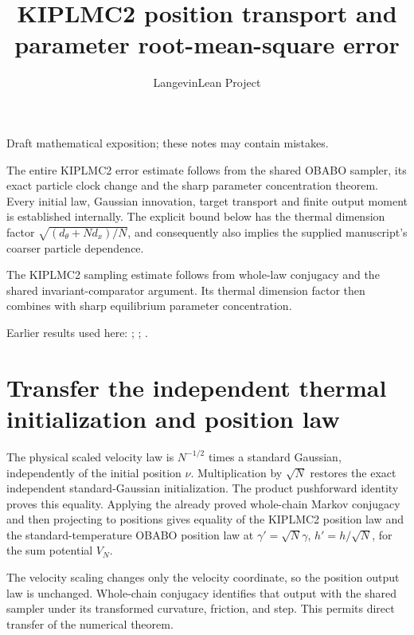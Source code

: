 \documentclass[11pt,a4paper]{article}
\title{\texorpdfstring{KIPLMC2 position transport and parameter root-mean-square error}{KIPLMC2 position transport and parameter root-mean-square error}}
\author{LangevinLean Project}
\date{}
\begin{document}
\maketitle
Draft mathematical exposition; these notes may contain mistakes.


The entire KIPLMC2 error estimate follows from the shared OBABO sampler, its exact particle clock change and the sharp parameter concentration theorem. Every initial law, Gaussian innovation, target transport and finite output moment is established internally. The explicit bound below has the thermal dimension factor \(\sqrt{(d_\theta+Nd_x)/N}\), and consequently also implies the supplied manuscript’s coarser particle dependence.



The KIPLMC2 sampling estimate follows from whole-law conjugacy and the shared invariant-comparator argument. Its thermal dimension factor then combines with sharp equilibrium parameter concentration.



Earlier results used here: \cite[Section~3.118]{LangevinLean2026Kinetic}; \cite[Section~3.122]{LangevinLean2026Kinetic}; \cite[Section~3.123]{LangevinLean2026Kinetic}.

\section{\texorpdfstring{Transfer the independent thermal initialization and position law}{Transfer the independent thermal initialization and position law}}


The physical scaled velocity law is \(N^{-1/2}\) times a standard Gaussian, independently of the initial position \(\nu\). Multiplication by \(\sqrt N\) restores the exact independent standard-Gaussian initialization. The product pushforward identity proves this equality. Applying the already proved whole-chain Markov conjugacy and then projecting to positions gives equality of the KIPLMC2 position law and the standard-temperature OBABO position law at \(\gamma\prime=\sqrt N\gamma\), \(h\prime=h/\sqrt N\), for the sum potential \(V_N\).



The velocity scaling changes only the velocity coordinate, so the position output law is unchanged. Whole-chain conjugacy identifies that output with the shared sampler under its transformed curvature, friction, and step. This permits direct transfer of the numerical theorem.
\end{document}
